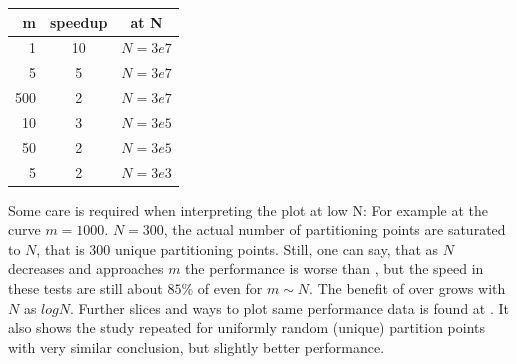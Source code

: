 %
%
%
%

\begin{center}
\begin{tabular}{r|c|c} %
  \textbf{m} & \textbf{speedup} & \textbf{at N}\\
  \hline 
1 & 10 & $N=3e7$\\
5 & 5 & $N=3e7$\\
500 & 2 & $N=3e7$\\
\hline
10 & 3 & $N=3e5$\\
50 & 2 & $N=3e5$\\
\hline
5 & 2 & $N=3e3$\\
\end{tabular}
\end{center}

Some care is required when interpreting the plot at low N: For example at the curve $m=1000$. $N=300$, the actual number of partitioning points are saturated to $N$, that is $300$ unique partitioning points. Still, one can say, that as $N$ decreases and approaches $m$ the performance is worse than , but the speed in these tests are still about $85\%$ of  even for $m \sim N$. The benefit of  over  grows with $N$ as $log N$. Further slices and ways to plot same performance data is found at \cite{p2375RefImpl}. It also shows the study repeated for uniformly random (unique) partition points with very similar conclusion, but slightly better performance.




